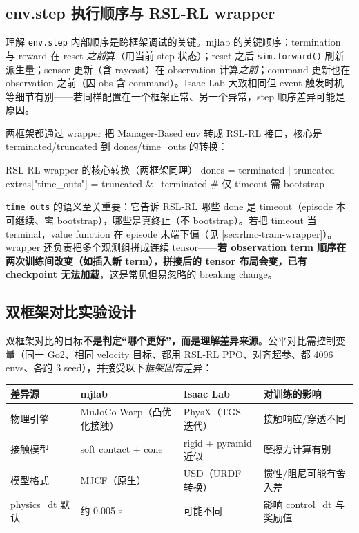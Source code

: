 \subsection{env.step 执行顺序与 RSL-RL wrapper}
\label{sec:rlmc-ql-dualframework-step}

理解 \verb|env.step| 内部顺序是跨框架调试的关键。mjlab 的关键顺序：termination 与 reward 在 reset \emph{之前}算（用当前 step 状态）；reset 之后 \verb|sim.forward()| 刷新派生量；sensor 更新（含 raycast）在 observation 计算\emph{之前}；command 更新也在 observation 之前（因 obs 含 command）。Isaac Lab 大致相同但 event 触发时机等细节有别——若同样配置在一个框架正常、另一个异常，step 顺序差异可能是原因。

两框架都通过 wrapper 把 Manager-Based env 转成 RSL-RL 接口，核心是 terminated/truncated 到 dones/time\_outs 的转换：

\begin{codebox}[Python]{RSL-RL wrapper 的核心转换（两框架同理）}
dones = terminated | truncated
extras["time_outs"] = truncated & ~terminated   # 仅 timeout 需 bootstrap
\end{codebox}

\verb|time_outs| 的语义至关重要：它告诉 RSL-RL 哪些 done 是 timeout（episode 本可继续、需 bootstrap），哪些是真终止（不 bootstrap）。若把 timeout 当 terminal，value function 在 episode 末端下偏（见 \cref{sec:rlmc-train-wrapper}）。wrapper 还负责把多个观测组拼成连续 tensor——\textbf{若 observation term 顺序在两次训练间改变（如插入新 term），拼接后的 tensor 布局会变，已有 checkpoint 无法加载}，这是常见但易忽略的 breaking change。

\subsection{双框架对比实验设计}
\label{sec:rlmc-ql-dualframework-exp}

双框架对比的目标\textbf{不是判定“哪个更好”，而是理解差异来源}。公平对比需控制变量（同一 Go2、相同 velocity 目标、都用 RSL-RL PPO、对齐超参、都 4096 envs、各跑 3 seed），并接受以下\emph{框架固有}差异：

\begin{center}
\small
\begin{tabular}{@{}llll@{}}
\toprule
差异源 & mjlab & Isaac Lab & 对训练的影响 \\
\midrule
物理引擎 & MuJoCo Warp（凸优化接触） & PhysX（TGS 迭代） & 接触响应/穿透不同 \\
接触模型 & soft contact + cone & rigid + pyramid 近似 & 摩擦力计算有别 \\
模型格式 & MJCF（原生） & USD（URDF 转换） & 惯性/阻尼可能有舍入差 \\
physics\_dt 默认 & 约 0.005 s & 可能不同 & 影响 control\_dt 与奖励值 \\
\bottomrule
\end{tabular}
\end{center}

